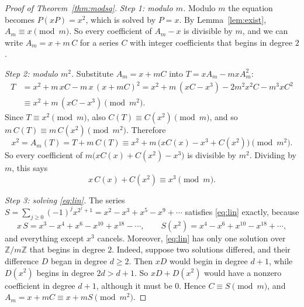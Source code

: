 \documentclass[11pt,a4paper]{article}
\theoremstyle{definition}
\theoremstyle{remark}
\newcommand{\Z}{\mathbb{Z}}
\begin{document}
\begin{proof}[Proof of Theorem~\ref{thm:modsq}]
\emph{Step 1: modulo $m$.} Modulo $m$ the equation becomes $P(xP)=x^2$, which is solved by $P=x$. By
Lemma~\ref{lem:exist}, $A_m\equiv x\pmod m$. So every coefficient of $A_m-x$ is divisible by $m$, and we can write
$A_m=x+m\,C$ for a series $C$ with integer coefficients that begins in degree $2$.

\emph{Step 2: modulo $m^2$.} Substitute $A_m=x+mC$ into $T=xA_m-mxA_m^2$:
\begin{align*}
T&=x^2+m\,xC-m\,x\,(x+mC)^2=x^2+m\,(xC-x^3)-2m^2x^2C-m^3xC^2\\
&\equiv x^2+m\,(xC-x^3)\pmod{m^2}.
\end{align*}
Since $T\equiv x^2\pmod m$, also $C(T)\equiv C(x^2)\pmod m$, and so $m\,C(T)\equiv m\,C(x^2)\pmod{m^2}$. Therefore
\[
x^2=A_m(T)=T+m\,C(T)\equiv x^2+m\,\bigl(xC(x)-x^3+C(x^2)\bigr)\pmod{m^2}.
\]
So every coefficient of $m\bigl(xC(x)+C(x^2)-x^3\bigr)$ is divisible by $m^2$. Dividing by $m$, this says
\begin{equation}\label{eq:lin}
x\,C(x)+C(x^2)\equiv x^3\pmod m .
\end{equation}

\emph{Step 3: solving \eqref{eq:lin}.} The series $S=\sum_{j\ge0}(-1)^jx^{2^j+1}=x^2-x^3+x^5-x^9+\cdots$ satisfies
\eqref{eq:lin} exactly, because
\[
x\,S=x^3-x^4+x^6-x^{10}+x^{18}-\cdots,\qquad S(x^2)=x^4-x^6+x^{10}-x^{18}+\cdots,
\]
and everything except $x^3$ cancels. Moreover, \eqref{eq:lin} has only one solution over $\Z/m\Z$ that begins in
degree $2$. Indeed, suppose two solutions differed, and their difference $D$ began in degree $d\ge2$. Then $xD$ would
begin in degree $d+1$, while $D(x^2)$ begins in degree $2d>d+1$. So $xD+D(x^2)$ would have a nonzero coefficient in
degree $d+1$, although it must be $0$. Hence $C\equiv S\pmod m$, and $A_m=x+mC\equiv x+mS\pmod{m^2}$.
\end{proof}
\end{document}
